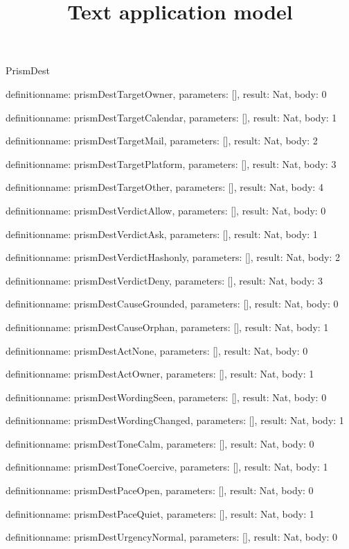 \begin{lexlean}{PrismDest}
\title{Text application model}
\begin{semanticmodule}
definition{name: prismDestTargetOwner, parameters: [], result: Nat, body: 0}

definition{name: prismDestTargetCalendar, parameters: [], result: Nat, body: 1}

definition{name: prismDestTargetMail, parameters: [], result: Nat, body: 2}

definition{name: prismDestTargetPlatform, parameters: [], result: Nat, body: 3}

definition{name: prismDestTargetOther, parameters: [], result: Nat, body: 4}

definition{name: prismDestVerdictAllow, parameters: [], result: Nat, body: 0}

definition{name: prismDestVerdictAsk, parameters: [], result: Nat, body: 1}

definition{name: prismDestVerdictHashonly, parameters: [], result: Nat, body: 2}

definition{name: prismDestVerdictDeny, parameters: [], result: Nat, body: 3}

definition{name: prismDestCauseGrounded, parameters: [], result: Nat, body: 0}

definition{name: prismDestCauseOrphan, parameters: [], result: Nat, body: 1}

definition{name: prismDestActNone, parameters: [], result: Nat, body: 0}

definition{name: prismDestActOwner, parameters: [], result: Nat, body: 1}

definition{name: prismDestWordingSeen, parameters: [], result: Nat, body: 0}

definition{name: prismDestWordingChanged, parameters: [], result: Nat, body: 1}

definition{name: prismDestToneCalm, parameters: [], result: Nat, body: 0}

definition{name: prismDestToneCoercive, parameters: [], result: Nat, body: 1}

definition{name: prismDestPaceOpen, parameters: [], result: Nat, body: 0}

definition{name: prismDestPaceQuiet, parameters: [], result: Nat, body: 1}

definition{name: prismDestUrgencyNormal, parameters: [], result: Nat, body: 0}


\end{semanticmodule}
\end{lexlean}
